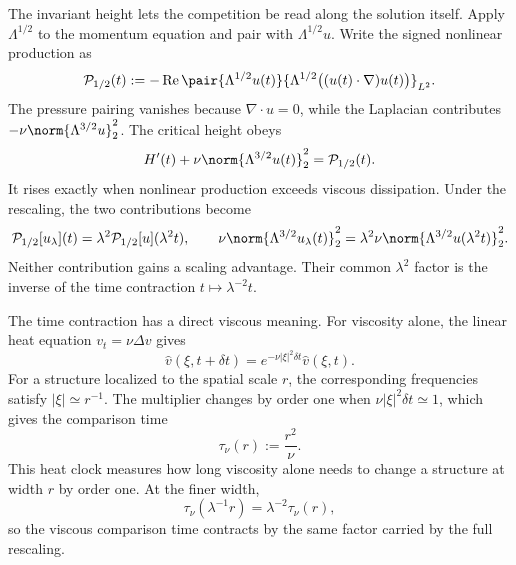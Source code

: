 
The invariant height lets the competition be read along the solution itself.
Apply \(\Lambda^{1/2}\) to the momentum equation and pair with \(\Lambda^{1/2}u\).
Write the signed nonlinear production as
\[
  \mathcal P_{1/2}(t)
  :=
  -\operatorname{Re}
  \pair
    {\Lambda^{1/2}u(t)}
    {\Lambda^{1/2}\bigl((u(t)\cdot\nabla)u(t)\bigr)}_{L^2}.
\]
The pressure pairing vanishes because \(\nabla\cdot u=0\), while the Laplacian contributes \(-\nu\norm{\Lambda^{3/2}u}_2^2\).
The critical height obeys
\[
  H'(t)
  +
  \nu\norm{\Lambda^{3/2}u(t)}_2^2
  =
  \mathcal P_{1/2}(t).
\]
It rises exactly when nonlinear production exceeds viscous dissipation.
Under the rescaling, the two contributions become
\[
  \mathcal P_{1/2}[u_\lambda](t)
  =
  \lambda^2\mathcal P_{1/2}[u](\lambda^2t),
  \qquad
  \nu\norm{\Lambda^{3/2}u_\lambda(t)}_2^2
  =
  \lambda^2\nu\norm{\Lambda^{3/2}u(\lambda^2t)}_2^2.
\]
Neither contribution gains a scaling advantage.
Their common \(\lambda^2\) factor is the inverse of the time contraction \(t\mapsto\lambda^{-2}t\).


The time contraction has a direct viscous meaning.
For viscosity alone, the linear heat equation \(v_t=\nu\Delta v\) gives
\[
  \widehat v(\xi,t+\delta t)
  =
  e^{-\nu|\xi|^2\delta t}\widehat v(\xi,t).
\]
For a structure localized to the spatial scale \(r\), the corresponding frequencies satisfy \(|\xi|\simeq r^{-1}\).
The multiplier changes by order one when \(\nu|\xi|^2\delta t\simeq1\), which gives the comparison time
\[
  \tau_\nu(r)
  :=
  \frac{r^2}{\nu}.
\]
This heat clock measures how long viscosity alone needs to change a structure at width \(r\) by order one.
At the finer width,
\[
  \tau_\nu(\lambda^{-1}r)
  =
  \lambda^{-2}\tau_\nu(r),
\]
so the viscous comparison time contracts by the same factor carried by the full \NavierStokes{} rescaling.


